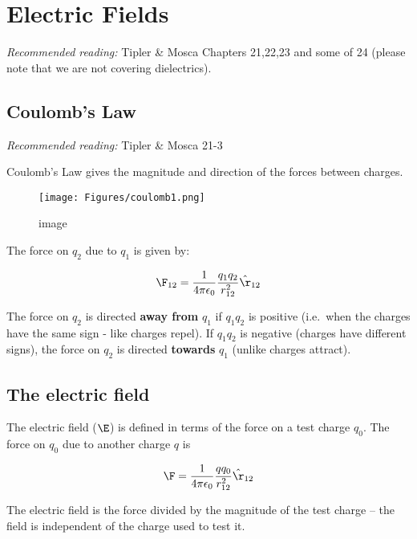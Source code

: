 \documentclass[
]{book}
\theoremstyle{definition}
\theoremstyle{definition}
\theoremstyle{definition}
\theoremstyle{definition}
\theoremstyle{remark}
\begin{document}
\hypertarget{electric-fields}{%
\chapter{Electric Fields}\label{electric-fields}}

\emph{Recommended reading:} Tipler \& Mosca Chapters 21,22,23 and some of 24
(please note that we are not covering dielectrics).

\hypertarget{coulombs-law}{%
\section{Coulomb's Law}\label{coulombs-law}}

\emph{Recommended reading:} Tipler \& Mosca 21-3

Coulomb's Law gives the magnitude and direction of the forces between
charges.

\begin{figure}
\centering
\texttt{[image: Figures/coulomb1.png]}
\caption{image}
\end{figure}

The force on \(q_2\) due to \(q_1\) is given by:

\[\label{eq:coulomb}
\F_{12}= \frac{1}{4\pi \epsilon_0} \frac{q_1 q_2}{r_{12}^2} \hat{\r}_{12}\]

The force on \(q_2\) is directed \textbf{away from} \(q_1\) if \(q_1 q_2\) is
positive (i.e.~when the charges have the same sign - like charges
repel). If \(q_1 q_2\) is negative (charges have different signs), the
force on \(q_2\) is directed \textbf{towards} \(q_1\) (unlike charges attract).

\hypertarget{the-electric-field}{%
\section{The electric field}\label{the-electric-field}}

The electric field (\(\E\)) is defined in terms of the force on a test
charge \(q_0\). The force on \(q_0\) due to another charge \(q\) is

\[\begin{aligned}
\F = \frac{1}{4\pi \epsilon_0} \frac{q q_0}{r_{12}^2} \hat{\r}_{12}
\end{aligned}\]

The electric field is the force divided by the magnitude of the test
charge -- the field is independent of the charge used to test it.
\end{document}
